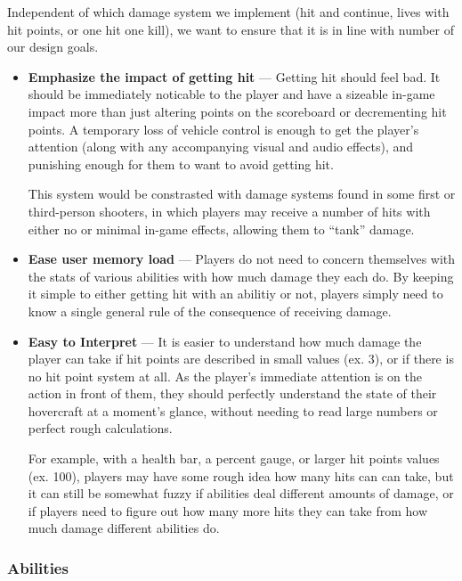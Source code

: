 \documentclass{article}
\theoremstyle{definition}
\begin{document}
Independent of which damage system we implement (hit and continue, lives with
hit points, or one hit one kill), we want to ensure that it is in line with
number of our design goals.
\begin{itemize}
  \item \textbf{Emphasize the impact of getting hit} --- Getting hit should
    feel bad. It should be immediately noticable to the player and have
    a sizeable in-game impact more than just altering points on the scoreboard
    or decrementing hit points. A temporary loss of vehicle control is enough
    to get the player's attention (along with any accompanying visual and audio
    effects), and punishing enough for them to want to avoid getting hit.

    This system would be constrasted with damage systems found in some first or
    third-person shooters, in which players may receive a number of hits with
    either no or minimal in-game effects, allowing them to ``tank'' damage.
  \item \textbf{Ease user memory load} --- Players do not need to concern
    themselves with the stats of various abilities with how much damage they
    each do. By keeping it simple to either getting hit with an abilitiy or
    not, players simply need to know a single general rule of the consequence
    of receiving damage.
  \item \textbf{Easy to Interpret} --- It is easier to understand how much
    damage the player can take if hit points are described in small values (ex.
    3), or if there is no hit point system at all. As the player's immediate
    attention is on the action in front of them, they should perfectly
    understand the state of their hovercraft at a moment's glance, without
    needing to read large numbers or perfect rough calculations.

    For example, with a health bar, a percent gauge, or larger hit points
    values (ex. 100), players may have some rough idea how many hits can can
    take, but it can still be somewhat fuzzy if abilities deal different
    amounts of damage, or if players need to figure out how many more hits they
    can take from how much damage different abilities do.
\end{itemize}

\subsubsection{Abilities}
\end{document}

